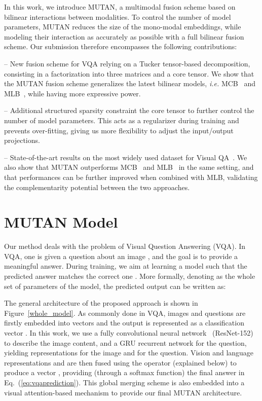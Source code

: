 \documentclass[10pt,twocolumn,letterpaper]{article}
\begin{document}
In this work, we introduce MUTAN, a multimodal fusion scheme based on bilinear interactions between modalities. 
To control the number of model parameters, MUTAN reduces the size of the mono-modal embeddings, while modeling their interaction as accurately as possible with a full bilinear fusion scheme. 
Our submission therefore encompasses the following contributions:

-- New fusion scheme for VQA relying on a Tucker tensor-based decomposition, consisting in a factorization into three matrices and a core tensor. 
We show that the MUTAN fusion scheme generalizes the latest bilinear models, \textit{i.e.} MCB~\cite{fukui16mcb} and MLB~\cite{Kim2017}, while having more expressive power. 
 
 -- Additional structured sparsity constraint the core tensor to further control the number of model parameters. This acts as a regularizer during training and prevents over-fitting, giving us more flexibility to adjust the input/output projections.
 
 -- State-of-the-art results on the most widely used dataset for Visual QA~\cite{VQA}. 
We also show that MUTAN outperforms MCB~\cite{fukui16mcb} and MLB~\cite{Kim2017} in the same setting, and that performances can be further improved when combined with MLB, validating the complementarity potential
between the two approaches.  

 \section{MUTAN Model}
\label{sec:model}
Our method deals with the problem of Visual Question Answering (VQA). 
In VQA, one is given a  question  about an image , and the goal is to provide a meaningful answer.
During training, we aim at learning a model such that
the predicted answer  matches the correct one . 
More formally, denoting as  the whole set of parameters of the model, the predicted output  can be written as:



The general architecture of the proposed approach is shown in Figure~\ref{whole_model}. 
As commonly done in VQA, images  and questions  are firstly embedded into vectors and the output is represented as a classification vector  . In this work, we use a fully convolutional neural network~\cite{He2015} (ResNet-152) to describe the image content,
and a GRU recurrent network \cite{Kiros2015, ChoMBB14} for the question, yielding representations  for the image and  for the question.
Vision and language representations  and  are then fused using the operator  (explained below) to produce a vector , providing (through a softmax function) the final answer in Eq.~(\ref{eq:vqaprediction}). This global merging scheme is also embedded into a visual attention-based mechanism \cite{Kim2017} to provide our final MUTAN architecture.
\end{document}
